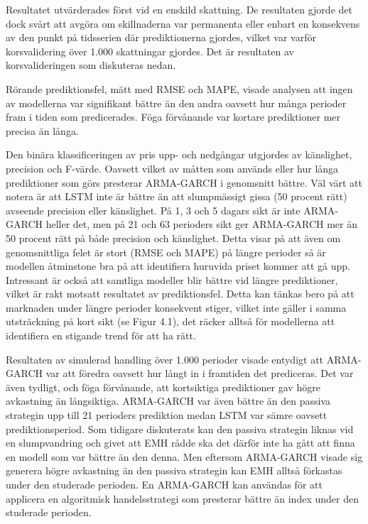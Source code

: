 \documentclass[11pt]{article}
\numberwithin{equation}{section}
\numberwithin{table}{section}
\numberwithin{figure}{section}
\begin{document}
Resultatet utvärderades först vid en enskild skattning. De resultaten gjorde det dock svårt att avgöra om skillnaderna var permanenta eller enbart en konsekvens av den punkt på tidsserien där prediktionerna gjordes, vilket var varför korsvalidering över 1.000 skattningar gjordes. Det är resultaten av korsvalideringen som diskuteras nedan. 

Rörande prediktionsfel, mätt med RMSE och MAPE, visade analysen att ingen av modellerna var signifikant bättre än den andra oavsett hur många perioder fram i tiden som predicerades. Föga förvånande var kortare prediktioner mer precisa än långa. 

Den binära klassificeringen av pris upp- och nedgångar utgjordes av känslighet, precision och F-värde. Oavsett vilket av måtten som används eller hur långa prediktioner som görs presterar ARMA-GARCH i genomsnitt bättre. Väl värt att notera är att LSTM inte är bättre än att slumpmässigt gissa (50 procent rätt) avseende precision eller känslighet. På 1, 3 och 5 dagars sikt är inte ARMA-GARCH heller det, men på 21 och 63 perioders sikt ger ARMA-GARCH mer än 50 procent rätt på både precision och känslighet. Detta visar på att även om genomsnittliga felet är stort (RMSE och MAPE) på längre perioder så är modellen åtminstone bra på att identifiera huruvida priset kommer att gå upp. Intressant är också att samtliga modeller blir bättre vid längre prediktioner, vilket är rakt motsatt resultatet av prediktionsfel. Detta kan tänkas bero på att marknaden under längre perioder konsekvent stiger, vilket inte gäller i samma utsträckning på kort sikt (se Figur 4.1), det räcker alltså för modellerna att identifiera en stigande trend för att ha rätt.   

Resultaten av simulerad handling över 1.000 perioder visade entydigt att ARMA-GARCH var att föredra oavsett hur långt in i framtiden det prediceras. Det var även tydligt, och föga förvånande, att kortsiktiga prediktioner gav högre avkastning än långsiktiga. ARMA-GARCH var även bättre än den passiva strategin upp till 21 perioders prediktion medan LSTM var sämre oavsett prediktionsperiod. Som tidigare diskuterats kan den passiva strategin liknas vid en slumpvandring och givet att EMH rådde ska det därför inte ha gått att finna en modell som var bättre än den denna. Men eftersom ARMA-GARCH visade sig generera högre avkastning än den passiva strategin kan EMH alltså förkastas under den studerade perioden. En ARMA-GARCH kan användas för att applicera en algoritmisk handelsstrategi som presterar bättre än index under den studerade perioden.
\end{document}
